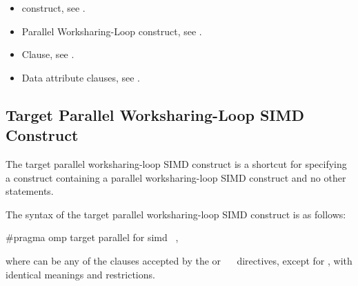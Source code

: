 \crossreferences
\begin{itemize}
\item {} construct, see
.

\item Parallel Worksharing-Loop construct, see
.

\item {} Clause, see .

\item Data attribute clauses, see
.
\end{itemize}



\subsection{Target Parallel Worksharing-Loop SIMD Construct}
\label{subsec:Target Parallel Worksharing-Loop SIMD Construct}
\summary
The target parallel worksharing-loop SIMD construct is a shortcut for specifying 
a  construct containing a parallel worksharing-loop SIMD construct 
and no other statements.

\syntax
\begin{ccppspecific}
The syntax of the target parallel worksharing-loop SIMD construct is as follows:

\begin{ompcPragma}
#pragma omp target parallel for simd \
            \plc{[clause[[},\plc{] clause] ... ] new-line}
\end{ompcPragma}

where  can be any of the clauses accepted by the  or
\code{parallel}~\code{for}~\code{simd} directives, except for \code{copyin}, 
with identical meanings and restrictions.
\end{ccppspecific}

